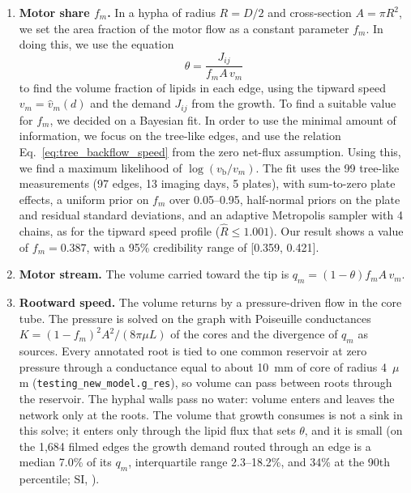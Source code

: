 \begin{enumerate}
A constant motor speed scores worse in both comparisons.
The scores reported use the constants above.
  \item \textbf{Motor share $f_m$.}
In a hypha of radius $R = D/2$ and cross-section $A = \pi R^2$, we set the area fraction of the motor flow as a constant parameter $f_m$. In doing this, we use the equation
\begin{equation}
\theta = \frac{J_{ij}}{f_m A\, v_m}
\end{equation}
to find the volume fraction of lipids in each edge, using the tipward speed $v_m = \hat{v}_m(d)$ and the demand $J_{ij}$ from the growth. To find a suitable value for $f_m$, we decided on a Bayesian fit. In order to use the minimal amount of information, we focus on the tree-like edges, and use the relation Eq.~\eqref{eq:tree_backflow_speed} from the zero net-flux assumption. Using this, we find a maximum likelihood of $\log(v_\mathrm{b}/v_m)$. The fit uses the 99 tree-like measurements (97 edges, 13 imaging days, 5 plates), with sum-to-zero plate effects, a uniform prior on $f_m$ over 0.05--0.95, half-normal priors on the plate and residual standard deviations, and an adaptive Metropolis sampler with 4 chains, as for the tipward speed profile ($\hat{R} \leq 1.001$). Our result shows a value of $f_m = 0.387$, with a 95\% credibility range of [0.359, 0.421].
  \item \textbf{Motor stream.}
The volume carried toward the tip is $q_m = (1-\theta) f_m A\, v_m$.
  \item \textbf{Rootward speed.}
The volume returns by a pressure-driven flow in the core tube.
The pressure is solved on the graph with Poiseuille conductances $K = (1-f_m)^2 A^2 / (8 \pi \mu L)$ of the cores and the divergence of $q_m$ as sources.
Every annotated root is tied to one common reservoir at zero pressure through a conductance equal to about 10~mm of core of radius 4~$\mu$m (\texttt{testing\_new\_model.g\_res}), so volume can pass between roots through the reservoir.
The hyphal walls pass no water: volume enters and leaves the network only at the roots.
The volume that growth consumes is not a sink in this solve; it enters only through the lipid flux that sets $\theta$, and it is small (on the 1,684 filmed edges the growth demand routed through an edge is a median 7.0\% of its $q_m$, interquartile range 2.3--18.2\%, and 34\% at the 90th percentile; SI, ).

\end{enumerate}
